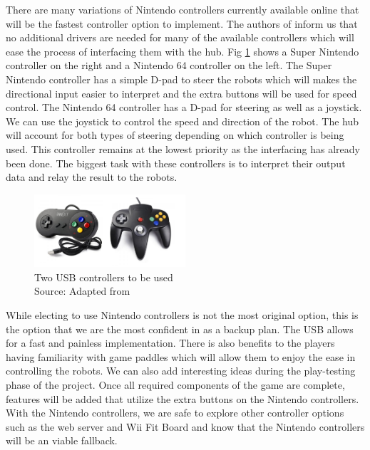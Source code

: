 \documentclass[11pt]{ieeeconf}
\begin{document}
There are many variations of Nintendo controllers currently available online that will be the fastest controller option to implement. The authors of \cite{controller:19} inform us that no additional drivers are needed for many of the available controllers which will ease the process of interfacing them with the hub. Fig \ref{Controllers} shows a Super Nintendo controller on the right and a Nintendo 64 controller on the left. The Super Nintendo controller has a simple D-pad to steer the robots which will makes the directional input easier to interpret and the extra buttons will be used for speed control. The Nintendo 64 controller has a D-pad for steering as well as a joystick. We can use the joystick to control the speed and direction of the robot. The hub will account for both types of steering depending on which controller is being used. This controller remains at the lowest priority as the interfacing has already been done. The biggest task with these controllers is to interpret their output data and relay the result to the robots.

\begin{figure}[H]
\centering
\captionsetup{justification=centering}
\includegraphics[width=0.5\textwidth]{images/controllers.png}
\caption{Two USB controllers to be used \\ Source: Adapted from \cite{controller:19}}
\label{Controllers}
\end{figure}

While electing to use Nintendo controllers is not the most original option, this is the option that we are the most confident in as a backup plan. The USB allows for a fast and painless implementation. There is also benefits to the players having familiarity with game paddles which will allow them to enjoy the ease in controlling the robots. We can also add interesting ideas during the play-testing phase of the project. Once all required components of the game are complete, features will be added that utilize the extra buttons on the Nintendo controllers. With the Nintendo controllers, we are safe to explore other controller options such as the web server and Wii Fit Board and know that the Nintendo controllers will be an viable fallback. 
\end{document}
